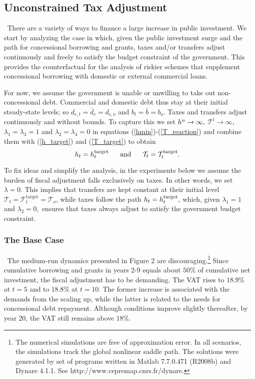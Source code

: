 \documentclass[11pt]{article}
\begin{document}
\subsection{Unconstrained Tax Adjustment}

\quad\ \thinspace There are a variety of ways to finance a large increase in
public investment. We start by analyzing the case in which, given the public
investment surge and the path for concessional borrowing and grants, taxes
and/or transfers adjust continuously and freely to satisfy the budget
constraint of the government. This provides the counterfactual for the
analysis of riskier schemes that supplement concessional borrowing with
domestic or external commercial loans.

For now, we assume the government is unable or unwilling to take out
non-concessional debt. Commercial and domestic debt thus stay at their
initial steady-state levels; so $d_{c,t}=\bar{d}_{c}=d_{c,o}$ and $b_{t}=%
\bar{b}=b_{o}$. Taxes and transfers adjust continuously and without bounds.
To capture this we set ${\small h}^{u}\rightarrow \infty ,$ $\mathcal{T}%
^{l}\rightarrow \infty $, $\lambda _{1}=\lambda _{3}=1$ and $\lambda
_{2}=\lambda _{4}=0$ in equations (\ref{hmin})-(\ref{T_reaction}) and
combine them with (\ref{h_target}) and (\ref{T_target}) to obtain 
\begin{equation*}
h_{t}={\small h}_{t}^{\text{target}}\text{ \ \ \ \ and \ \ \ \ }\mathcal{T}%
_{t}=\mathcal{T}_{t}^{\text{target}}.
\end{equation*}

To fix ideas and simplify the analysis, in the experiments below we assume
the burden of fiscal adjustment falls exclusively on taxes. In other words,
we set $\lambda =0.$ This implies that transfers are kept constant at their
initial level $\mathcal{T}_{t}=\mathcal{T}_{t}^{\text{target}}=\mathcal{T}%
_{o}$, while taxes follow the path $h_{t}={\small h}_{t}^{\text{target}},$
which, given $\lambda _{1}=1$ and $\lambda _{2}=0,$ ensures that taxes
always adjust to satisfy the government budget constraint.

\subsubsection{The Base Case}

\quad\ \thinspace The medium-run dynamics presented in Figure 2 are
discouraging.\footnote{%
The numerical simulations are free of approximation error. In all scenarios,
the simulations track the global nonlinear saddle path. The solutions were
generated by set of programs written in Matlab 7.7.0.471 (R2008b) and Dynare
4.1.1. See http://www.cepremap.cnrs.fr/dynare.} Since cumulative borrowing
and grants in years 2-9 equals about $50\%$ of cumulative net investment,
the fiscal adjustment has to be demanding. The VAT rises to $18.9\%$ at $t=5$
and to $18.8\%$ at $t=10$. The former increase is associated with the
demands from the scaling up, while the latter is related to the needs for
concessional debt repayment. Although conditions improve slightly
thereafter, by year 20, the VAT still remains above $18\%$.
\end{document}
